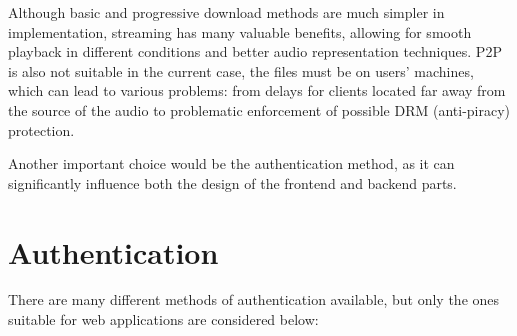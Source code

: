 Although basic and progressive download methods are much simpler in implementation,
streaming has many valuable benefits, allowing for smooth playback in different
conditions and better audio representation techniques. P2P is also not suitable
in the current case, the files must be on users' machines, which can lead
to various problems: from delays for clients located far away from the source of the audio
to problematic enforcement of possible DRM (anti-piracy) protection.

Another important choice would be the authentication method, as it can significantly influence both
the design of the frontend and backend parts.


\section{Authentication}
There are many different methods of authentication available, but only the ones suitable for
web applications are considered below:

